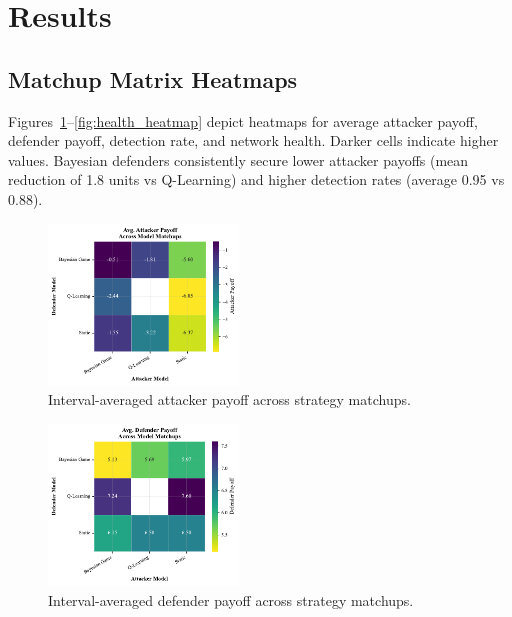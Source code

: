 \documentclass[conference]{IEEEtran}
\begin{document}
\section{Results}

\subsection{Matchup Matrix Heatmaps}
Figures~\ref{fig:atk_payoff_heatmap}--\ref{fig:health_heatmap} depict heatmaps for average attacker payoff, defender payoff, detection rate, and network health. Darker cells indicate higher values. Bayesian defenders consistently secure lower attacker payoffs (mean reduction of 1.8 units vs Q-Learning) and higher detection rates (average 0.95 vs 0.88).

\begin{figure}[htbp]
  \centering
  \includegraphics[width=0.45\textwidth]{fig_atk_payoff_heatmap.pdf}
  \caption{Interval-averaged attacker payoff across strategy matchups.}
  \label{fig:atk_payoff_heatmap}
\end{figure}

\begin{figure}[htbp]
  \centering
  \includegraphics[width=0.45\textwidth]{fig_def_payoff_heatmap.pdf}
  \caption{Interval-averaged defender payoff across strategy matchups.}
  \label{fig:def_payoff_heatmap}
\end{figure}
\end{document}
